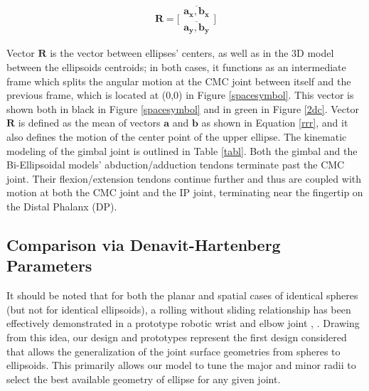 \documentclass[journal]{IEEEtran}
\begin{document}
\begin{equation} 
\mathbf{R} = \Biggr[ \begin{matrix} \overline{ \mathbf{a_x,b_x}} \\ \overline{ \mathbf{a_y,b_y}} \end{matrix} \Biggr]
\label{rrr}
\end{equation}

Vector $\mathbf{R}$ is the vector between ellipses' centers, as well as in the 3D model between the ellipsoids centroids; in both cases, it functions as an intermediate frame which splits the angular motion at the CMC joint between itself and the previous frame, which is located at (0,0) in Figure \ref{spacesymbol}. This vector is shown both in black in Figure \ref{spacesymbol} and in green in Figure \ref{2dc}. Vector $\mathbf{R}$ is defined as the mean of vectors $\mathbf{a}$ and $\mathbf{b}$ as shown in Equation \ref{rrr}, and it also defines the motion of the center point of the upper ellipse. The kinematic modeling of the gimbal joint is outlined in Table \ref{tabl}. Both the gimbal and the Bi-Ellipsoidal models' abduction/adduction tendons terminate past the CMC joint. Their flexion/extension tendons continue further and thus are coupled with motion at both the CMC joint and the IP joint, terminating near the fingertip on the Distal Phalanx (DP). 


\subsection{Comparison via Denavit-Hartenberg Parameters}
\label{dhsection}

It should be noted that for both the planar and spatial cases of identical spheres (but not for identical ellipsoids), a rolling without sliding relationship has been effectively demonstrated in a prototype robotic wrist and elbow joint \cite{Koreatech-arm}, \cite{lims2}. Drawing from this idea, our design and prototypes represent the first design considered that allows the generalization of the joint surface geometries from spheres to ellipsoids. This primarily allows our model to tune the major and minor radii to select the best available geometry of ellipse for any given joint. %
\end{document}
